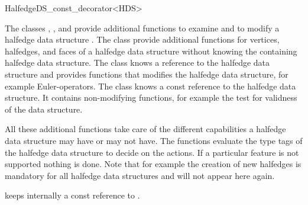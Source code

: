 
\ccRefPageBegin



\begin{ccRefClass}{HalfedgeDS_const_decorator<HDS>}
\label{pageHalfedgeDSconstDecoratorRef}

\ccDefinition
  
The classes ,
, and
 provide additional functions
to examine and to modify a halfedge data structure . The class
 provide additional functions
for vertices, halfedges, and faces of a halfedge data structure
without knowing the containing halfedge data structure. The class
 knows a reference to the halfedge
data structure and provides functions that modifies the halfedge data
structure, for example Euler-operators. The class
 knows a const reference to
the halfedge data structure. It contains non-modifying functions, for
example the test for validness of the data structure.

All these additional functions take care of the different capabilities
a halfedge data structure may have or may not have.  The functions
evaluate the type tags of the halfedge data structure to decide on the
actions. If a particular feature is not supported nothing is done.
Note that for example the creation of new halfedges is mandatory for
all halfedge data structures and will not appear here again.


\ccInheritsFrom


\ccCreation
{}

\ccTagFullDeclarations
{}
    {keeps internally a const reference to .}
\ccTagDefaults



\end{ccRefClass}

